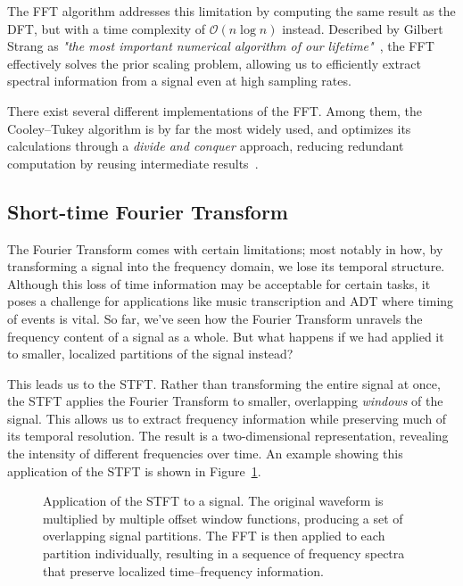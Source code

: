 The \gls{FFT} algorithm addresses this limitation by computing the same result as the \gls{DFT}, but with a time complexity of $\mathcal{O}(n\log{n})$ instead. Described by Gilbert Strang as \textit{"the most important numerical algorithm of our lifetime"}~\cite{strang1993wavelet}, the \gls{FFT} effectively solves the prior scaling problem, allowing us to efficiently extract spectral information from a signal even at high sampling rates.

There exist several different implementations of the \gls{FFT}. Among them, the Cooley–Tukey algorithm is by far the most widely used, and optimizes its calculations through a \textit{divide and conquer} approach, reducing redundant computation by reusing intermediate results~\cite{d3ea2d52-5ab2-3128-8b80-efb85267295d}.

\subsection{Short-time Fourier Transform}

The Fourier Transform comes with certain limitations; most notably in how, by transforming a signal into the frequency domain, we lose its temporal structure. Although this loss of time information may be acceptable for certain tasks, it poses a challenge for applications like music transcription and \gls{ADT} where timing of events is vital. So far, we've seen how the Fourier Transform unravels the frequency content of a signal as a whole. But what happens if we had applied it to smaller, localized partitions of the signal instead?

This leads us to the \gls{STFT}. Rather than transforming the entire signal at once, the \gls{STFT} applies the Fourier Transform to smaller, overlapping \textit{windows} of the signal. This allows us to extract frequency information while preserving much of its temporal resolution. The result is a two-dimensional representation, revealing the intensity of different frequencies over time. An example showing this application of the \gls{STFT} is shown in Figure~\ref{STFTFigure}.

\begin{figure}[H]
    \centering
    
    \caption{Application of the \gls{STFT} to a signal. The original waveform is multiplied by multiple offset window functions, producing a set of overlapping signal partitions. The \gls{FFT} is then applied to each partition individually, resulting in a sequence of frequency spectra that preserve localized time–frequency information.}
    \label{STFTFigure}
\end{figure}

